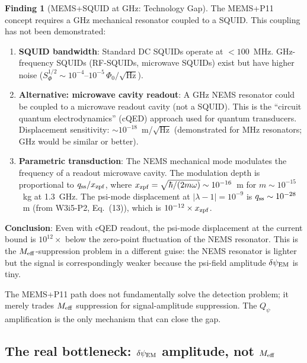 \documentclass[11pt]{article}
\newcommand{\lam}{\lambda}
\newcommand{\Meff}{M_{\rm eff}}
\newcommand{\Qpsi}{Q_\psi}
\newcommand{\lbone}{|\lam - 1|}
\newcommand{\dpsiEM}{\delta\psi_{\rm EM}}
\theoremstyle{definition}
\newtheorem{finding}[theorem]{Finding}
\theoremstyle{remark}
\begin{document}
\begin{finding}[MEMS+SQUID at GHz: Technology Gap]
\label{find:MEMS_SQUID_gap}
The MEMS+P11 concept requires a GHz mechanical resonator coupled to a
SQUID. This coupling has not been demonstrated:
\begin{enumerate}[nosep]
\item \textbf{SQUID bandwidth}: Standard DC SQUIDs operate at $<100$~MHz.
  GHz-frequency SQUIDs (RF-SQUIDs, microwave SQUIDs) exist but have
  higher noise ($S_\Phi^{1/2} \sim 10^{-4}$--$10^{-5}\,\Phi_0/\sqrt{\text{Hz}}$).
\item \textbf{Alternative: microwave cavity readout}: A GHz NEMS resonator
  could be coupled to a microwave readout cavity (not a SQUID). This is
  the ``circuit quantum electrodynamics'' (cQED) approach used for
  quantum transducers. Displacement sensitivity: $\sim 10^{-18}$~m/$\sqrt{\text{Hz}}$
  (demonstrated for MHz resonators; GHz would be similar or better).
\item \textbf{Parametric transduction}: The NEMS mechanical mode modulates
  the frequency of a readout microwave cavity. The modulation depth is
  proportional to $q_{\rm ss}/x_{\rm zpf}$, where $x_{\rm zpf} = \sqrt{\hbar/(2m\omega)}
  \sim 10^{-16}$~m for $m \sim 10^{-15}$~kg at 1.3~GHz. The psi-mode
  displacement at $\lbone = 10^{-9}$ is $q_{\rm ss} \sim 10^{-28}$~m
  (from W3i5-P2, Eq.~(13)), which is $10^{-12}\times x_{\rm zpf}$.
\end{enumerate}

\textbf{Conclusion}: Even with cQED readout, the psi-mode displacement
at the current bound is $10^{12}\times$ below the zero-point fluctuation
of the NEMS resonator. This is the $\Meff$-suppression problem in a
different guise: the NEMS resonator is lighter but the signal is
correspondingly weaker because the psi-field amplitude $\dpsiEM$ is tiny.

The MEMS+P11 path does not fundamentally solve the detection problem; it
merely trades $\Meff$ suppression for signal-amplitude suppression. The
$\Qpsi$ amplification is the only mechanism that can close the gap.
\end{finding}

\subsection{The real bottleneck: $\dpsiEM$ amplitude, not $\Meff$}
\label{ssec:real_bottleneck}
\end{document}
